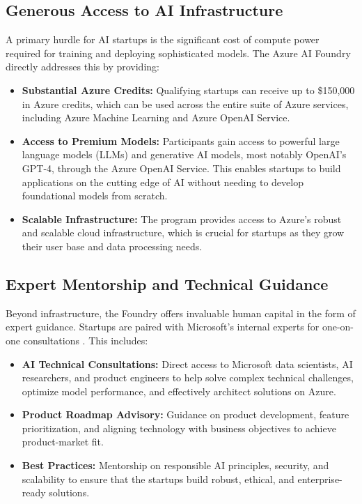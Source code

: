 \documentclass[11pt, a4paper]{article}
\begin{document}
\subsection{Generous Access to AI Infrastructure}
A primary hurdle for AI startups is the significant cost of compute power required for training and deploying sophisticated models. The Azure AI Foundry directly addresses this by providing:
\begin{itemize}
    \item \textbf{Substantial Azure Credits:} Qualifying startups can receive up to \$150,000 in Azure credits, which can be used across the entire suite of Azure services, including Azure Machine Learning and Azure OpenAI Service.
    \item \textbf{Access to Premium Models:} Participants gain access to powerful large language models (LLMs) and generative AI models, most notably OpenAI's GPT-4, through the Azure OpenAI Service. This enables startups to build applications on the cutting edge of AI without needing to develop foundational models from scratch.
    \item \textbf{Scalable Infrastructure:} The program provides access to Azure's robust and scalable cloud infrastructure, which is crucial for startups as they grow their user base and data processing needs.
\end{itemize}

\subsection{Expert Mentorship and Technical Guidance}
Beyond infrastructure, the Foundry offers invaluable human capital in the form of expert guidance. Startups are paired with Microsoft's internal experts for one-on-one consultations \cite{venturebeat}. This includes:
\begin{itemize}
    \item \textbf{AI Technical Consultations:} Direct access to Microsoft data scientists, AI researchers, and product engineers to help solve complex technical challenges, optimize model performance, and effectively architect solutions on Azure.
    \item \textbf{Product Roadmap Advisory:} Guidance on product development, feature prioritization, and aligning technology with business objectives to achieve product-market fit.
    \item \textbf{Best Practices:} Mentorship on responsible AI principles, security, and scalability to ensure that the startups build robust, ethical, and enterprise-ready solutions.
\end{itemize}
\end{document}
